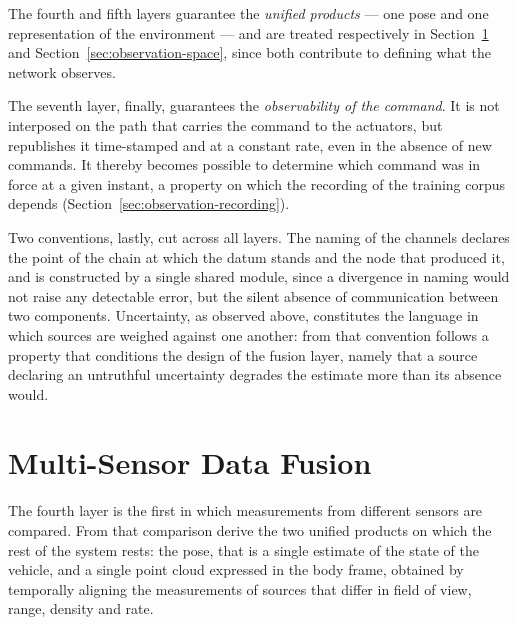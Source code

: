 The fourth and fifth layers guarantee the \emph{unified products} --- one pose
and one representation of the environment --- and are treated respectively in
Section~\ref{sec:pipeline-fusion} and Section~\ref{sec:observation-space}, since
both contribute to defining what the network observes.

The seventh layer, finally, guarantees the \emph{observability of the command}.
It is not interposed on the path that carries the command to the actuators, but
republishes it time-stamped and at a constant rate, even in the absence of new
commands. It thereby becomes possible to determine which command was in force at
a given instant, a property on which the recording of the training corpus
depends (Section~\ref{sec:observation-recording}).

Two conventions, lastly, cut across all layers. The naming of the channels
declares the point of the chain at which the datum stands and the node that
produced it, and is constructed by a single shared module, since a divergence in
naming would not raise any detectable error, but the silent absence of
communication between two components. Uncertainty, as observed above,
constitutes the language in which sources are weighed against one another: from
that convention follows a property that conditions the design of the fusion
layer, namely that a source declaring an untruthful uncertainty degrades the
estimate more than its absence would.

\section{Multi-Sensor Data Fusion}
\label{sec:pipeline-fusion}

The fourth layer is the first in which measurements from different sensors are
compared. From that comparison derive the two unified products on which the rest
of the system rests: the pose, that is a single estimate of the state of the
vehicle, and a single point cloud expressed in the body frame, obtained by
temporally aligning the measurements of sources that differ in field of view,
range, density and rate.

